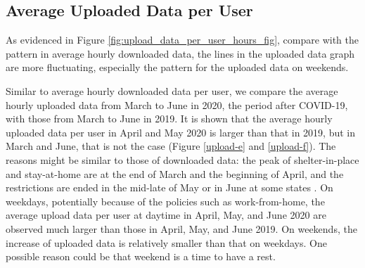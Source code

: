 \subsection{Average Uploaded Data per User}
\label{sec:upload-data-per-user-over-hours}


As evidenced in Figure \ref{fig:upload_data_per_user_hours_fig}, compare with the pattern in average hourly downloaded data, the lines in the uploaded data graph are more fluctuating, especially the pattern for the uploaded data on weekends.

Similar to average hourly downloaded data per user, we compare the average hourly uploaded data from March to June in 2020, the period after COVID-19, with those from March to June in 2019. It is shown that the average hourly uploaded data per user in April and May 2020 is larger than that in 2019, but in March and June, that is not the case (Figure \ref{upload-e} and \ref{upload-f}). The reasons might be similar to those of downloaded data: the peak of shelter-in-place and stay-at-home are 
at the end of March and the beginning of April, and the restrictions are ended in the mid-late of May or in June at some states \cite{covid19restriction}. On weekdays, potentially because of the policies such as work-from-home, the average upload data per user at daytime in April, May, and June 2020 are observed much larger than those in April, May, and June 2019. On weekends, the increase of uploaded data is relatively smaller than that on weekdays. One possible reason could be that weekend is a time to have a rest.  